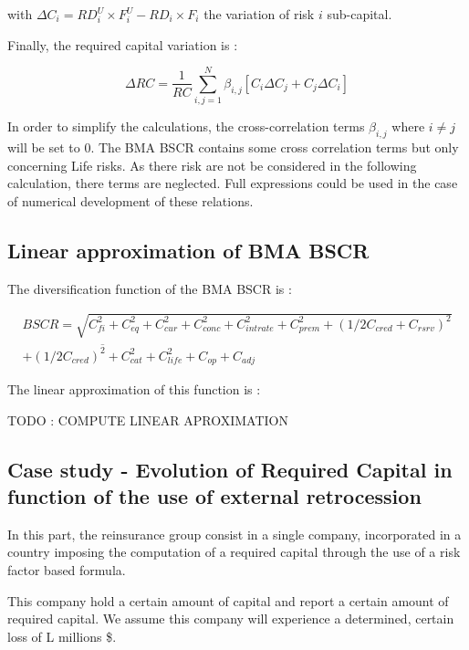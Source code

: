 with $\Delta C_i = RD_i^U \times F_i^U - RD_i \times F_i$ the variation of risk $i$ sub-capital.

Finally, the required capital variation is :

\begin{equation}
	\Delta RC = \frac{1}{RC} \sum_{i,j=1}^{N} \beta_{i,j} \left[ C_i \Delta C_j+ C_j \Delta C_i \right]
\end{equation}


In order to simplify the calculations, the cross-correlation terms $\beta_{i,j}$ where $i \neq j$ will be set to 0. The BMA BSCR contains some cross correlation terms but only concerning Life risks. As there risk are not be considered in the following calculation, there terms are neglected. Full expressions could be used in the case of numerical development of these relations.


\subsection{Linear approximation of BMA BSCR}

The diversification function of the BMA BSCR is :

\begin{multline}
	BSCR = \sqrt{C_{fi}^2 + C_{eq}^2 + C_{cur}^2 + C_{conc}^2 + C_{intrate}^2 + C_{prem}^2 + (1/2 C_{cred} + C_{rsrv} )^2 } \\ \overline{  + (1/2 C_{cred})^2 + C_{cat}^2 + C_{life}^2 } + C_{op} + C_{adj}
\end{multline}

The linear approximation of this function is :

TODO : COMPUTE LINEAR APROXIMATION



\subsection{Case study - Evolution of Required Capital in function of the use of external retrocession}
\label{sec:RC_SINGLE}

In this part, the reinsurance group consist in a single company, incorporated in a country imposing the computation of a required capital through the use of a risk factor based formula.

This company hold a certain amount of capital and report a certain amount of required capital. We assume this company will experience a determined, certain loss of L millions \$.

